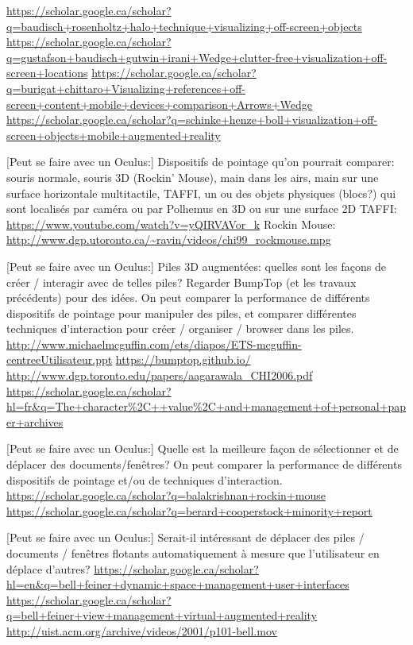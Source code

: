 \url{https://scholar.google.ca/scholar?q=baudisch+rosenholtz+halo+technique+visualizing+off-screen+objects}
\url{https://scholar.google.ca/scholar?q=gustafson+baudisch+gutwin+irani+Wedge+clutter-free+visualization+off-screen+locations}
\url{https://scholar.google.ca/scholar?q=burigat+chittaro+Visualizing+references+off-screen+content+mobile+devices+comparison+Arrows+Wedge}
\url{https://scholar.google.ca/scholar?q=schinke+henze+boll+visualization+off-screen+objects+mobile+augmented+reality}
 
 
[Peut se faire avec un Oculus:]
Dispositifs de pointage qu'on pourrait comparer: souris normale, souris 3D (Rockin' Mouse), main dans les airs, main sur une surface horizontale multitactile, TAFFI, un ou des objets physiques (blocs?) qui sont localisés par caméra ou par Polhemus en 3D ou sur une surface 2D
TAFFI: \url{https://www.youtube.com/watch?v=yQIRVAVor_k}
Rockin Mouse: \url{http://www.dgp.utoronto.ca/~ravin/videos/chi99_rockmouse.mpg}
 
[Peut se faire avec un Oculus:]
Piles 3D augmentées: quelles sont les façons de créer / interagir avec de telles piles? Regarder BumpTop (et les travaux précédents) pour des idées.  On peut comparer la performance de différents dispositifs de pointage pour manipuler des piles, et comparer différentes techniques d'interaction pour créer / organiser / browser dans les piles.
\url{http://www.michaelmcguffin.com/ets/diapos/ETS-mcguffin-centreeUtilisateur.ppt}
\url{https://bumptop.github.io/}
\url{http://www.dgp.toronto.edu/papers/aagarawala_CHI2006.pdf}
\url{https://scholar.google.ca/scholar?hl=fr&q=The+character%2C++value%2C+and+management+of+personal+paper+archives}
 
[Peut se faire avec un Oculus:]
Quelle est la meilleure façon de sélectionner et de déplacer des documents/fenêtres?
On peut comparer la performance de différents dispositifs de pointage et/ou de techniques d'interaction.
\url{https://scholar.google.ca/scholar?q=balakrishnan+rockin+mouse}
\url{https://scholar.google.ca/scholar?q=berard+cooperstock+minority+report}
 
[Peut se faire avec un Oculus:]
Serait-il intéressant de déplacer des piles / documents / fenêtres flotants automatiquement à mesure que l'utilisateur en déplace d'autres?
\url{https://scholar.google.ca/scholar?hl=en&q=bell+feiner+dynamic+space+management+user+interfaces}
\url{https://scholar.google.ca/scholar?q=bell+feiner+view+management+virtual+augmented+reality}
\url{http://uist.acm.org/archive/videos/2001/p101-bell.mov}
 
